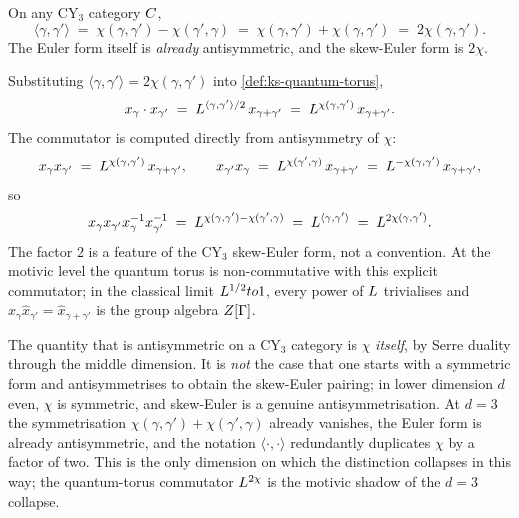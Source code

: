 \begin{corollary}
  \label{cor:skew-euler-equals-2chi}
  On any CY$_3$ category $C$,
  \[
    \langle \gamma, \gamma' \rangle \;=\; \chi(\gamma, \gamma') - \chi(\gamma', \gamma) \;=\;
    \chi(\gamma, \gamma') + \chi(\gamma, \gamma') \;=\; 2\chi(\gamma, \gamma').
  \]
  The Euler form itself is \emph{already} antisymmetric, and the skew-Euler
  form is $2\chi$.
\end{corollary}

Substituting $\langle \gamma, \gamma' \rangle = 2\chi(\gamma, \gamma')$ into
\cref{def:ks-quantum-torus},
\[
  x_\gamma \cdot x_{\gamma'} \;=\; L^{\langle \gamma, \gamma' \rangle / 2}\, x_{\gamma + \gamma'}
    \;=\; L^{\chi(\gamma, \gamma')}\, x_{\gamma + \gamma'}.
\]
The commutator is computed directly from antisymmetry of $\chi$:
\[
  x_\gamma x_{\gamma'} \;=\; L^{\chi(\gamma, \gamma')}\, x_{\gamma+\gamma'},
  \qquad
  x_{\gamma'} x_\gamma \;=\; L^{\chi(\gamma', \gamma)}\, x_{\gamma+\gamma'}
    \;=\; L^{-\chi(\gamma, \gamma')}\, x_{\gamma+\gamma'},
\]
so
\[
  x_\gamma x_{\gamma'} x_\gamma^{-1} x_{\gamma'}^{-1}
    \;=\; L^{\chi(\gamma, \gamma') - \chi(\gamma', \gamma)} \;=\; L^{\langle \gamma, \gamma'\rangle}
    \;=\; L^{2\chi(\gamma, \gamma')}.
\]
The factor $2$ is a feature of the CY$_3$ skew-Euler form, not a convention.
At the motivic level the quantum torus is non-commutative with this
explicit commutator; in the classical limit $L^{1/2} to 1$, every
power of $L$ trivialises and $\hat{x}_\gamma \hat{x}_{\gamma'} = \hat{x}_{\gamma+\gamma'}$ is the
group algebra $Z[\Gamma]$.

\begin{remark}
  \label{rem:chi-antisymmetric-cy3}
  The quantity that is antisymmetric on a CY$_3$ category is $\chi$
  \emph{itself}, by Serre duality through the middle dimension. It is
  \emph{not} the case that one starts with a symmetric form and
  antisymmetrises to obtain the skew-Euler pairing; in lower dimension
  $d$ even, $\chi$ is symmetric, and skew-Euler is a genuine
  antisymmetrisation. At $d = 3$ the symmetrisation
  $\chi(\gamma, \gamma') + \chi(\gamma', \gamma)$ already vanishes, the
  Euler form is already antisymmetric, and the notation $\langle \cdot, \cdot\rangle$
  redundantly duplicates $\chi$ by a factor of two. This is the only
  dimension on which the distinction collapses in this way; the
  quantum-torus commutator $L^{2\chi}$ is the motivic shadow of the
  $d=3$ collapse.
\end{remark}

